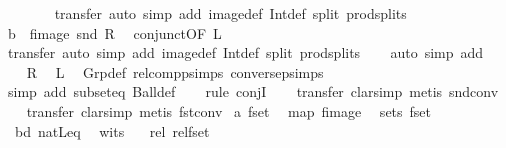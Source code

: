 \begin{isabellebody}
\ \ \ \ \ \ \isamarkupfalse%
\ {\isacharparenleft}transfer{\isacharcomma}\ auto\ simp\ add{\isacharcolon}\ image{\isacharunderscore}def\ Int{\isacharunderscore}def\ split{\isacharcolon}\ prod{\isachardot}splits{\isacharparenright}\isanewline
\ \ \ \ \isamarkupfalse%
\ {\isacharasterisk}\ \isamarkupfalse%
\ {\isachardoublequoteopen}b\ {\isacharequal}\ fimage\ snd\ R{\isacharprime}{\isachardoublequoteclose}\ \isamarkupfalse%
\ conjunct{}{\isacharbrackleft}OF\ {\isacartoucheopen}{\isacharquery}L{\isacartoucheclose}{\isacharbrackright}\isanewline
\ \ \ \ \ \ \isamarkupfalse%
\ {\isacharparenleft}transfer{\isacharcomma}\ auto\ simp\ add{\isacharcolon}\ image{\isacharunderscore}def\ Int{\isacharunderscore}def\ split{\isacharcolon}\ prod{\isachardot}splits{\isacharparenright}\isanewline
\ \ \isamarkupfalse%
\ {\isacharparenleft}auto\ simp\ add{\isacharcolon}\ {\isacharasterisk}{\isacharparenright}\isanewline
{}\isamarkupfalse%
\isanewline
\ \ \isamarkupfalse%
\ {\isacharquery}R\ \isamarkupfalse%
\ {\isacharquery}L\ \isamarkupfalse%
\ Grp{\isacharunderscore}def\ relcompp{\isachardot}simps\ conversep{\isachardot}simps\isanewline
\ \ \isamarkupfalse%
\ {\isacharparenleft}simp\ add{\isacharcolon}\ subset{\isacharunderscore}eq\ Ball{\isacharunderscore}def{\isacharparenright}\isanewline
\ \ \isamarkupfalse%
\ {\isacharparenleft}rule\ conjI{\isacharparenright}\isanewline
\ \ \isamarkupfalse%
\ {\isacharparenleft}transfer{\isacharcomma}\ clarsimp{\isacharcomma}\ metis\ snd{\isacharunderscore}conv{\isacharparenright}\isanewline
\ \ \isamarkupfalse%
\ {\isacharparenleft}transfer{\isacharcomma}\ clarsimp{\isacharcomma}\ metis\ fst{\isacharunderscore}conv{\isacharparenright}\isanewline
{}\isamarkupfalse%
%
\endisatagproof
{\isafoldproof}%
%
\isadelimproof
\isanewline
%
\endisadelimproof
\isanewline
{}\isamarkupfalse%
\ {\isachardoublequoteopen}{\isacharprime}a\ fset{\isachardoublequoteclose}\isanewline
\ \ map{\isacharcolon}\ fimage\isanewline
\ \ sets{\isacharcolon}\ fset\isanewline
\ \ bd{\isacharcolon}\ natLeq\isanewline
\ \ wits{\isacharcolon}\ {\isachardoublequoteopen}{\isacharbraceleft}{\isacharbar}{\isacharbar}{\isacharbraceright}{\isachardoublequoteclose}\isanewline
\ \ rel{\isacharcolon}\ rel{\isacharunderscore}fset\isanewline
%
\isadelimproof
%
\endisadelimproof
%
\isatagproof
{}\isamarkupfalse%

\end{isabellebody}
